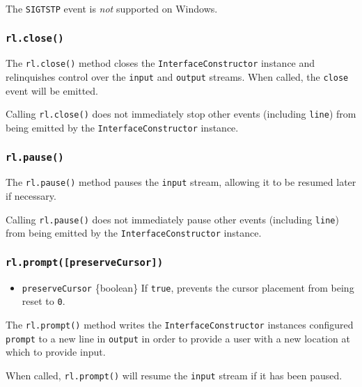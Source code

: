 The \texttt{\textquotesingle{}SIGTSTP\textquotesingle{}} event is
\emph{not} supported on Windows.

\subsubsection{\texorpdfstring{\texttt{rl.close()}}{rl.close()}}\label{rl.close}

The \texttt{rl.close()} method closes the \texttt{InterfaceConstructor}
instance and relinquishes control over the \texttt{input} and
\texttt{output} streams. When called, the
\texttt{\textquotesingle{}close\textquotesingle{}} event will be
emitted.

Calling \texttt{rl.close()} does not immediately stop other events
(including \texttt{\textquotesingle{}line\textquotesingle{}}) from being
emitted by the \texttt{InterfaceConstructor} instance.

\subsubsection{\texorpdfstring{\texttt{rl.pause()}}{rl.pause()}}\label{rl.pause}

The \texttt{rl.pause()} method pauses the \texttt{input} stream,
allowing it to be resumed later if necessary.

Calling \texttt{rl.pause()} does not immediately pause other events
(including \texttt{\textquotesingle{}line\textquotesingle{}}) from being
emitted by the \texttt{InterfaceConstructor} instance.

\subsubsection{\texorpdfstring{\texttt{rl.prompt({[}preserveCursor{]})}}{rl.prompt({[}preserveCursor{]})}}\label{rl.promptpreservecursor}

\begin{itemize}
\tightlist
\item
  \texttt{preserveCursor} \{boolean\} If \texttt{true}, prevents the
  cursor placement from being reset to \texttt{0}.
\end{itemize}

The \texttt{rl.prompt()} method writes the \texttt{InterfaceConstructor}
instances configured \texttt{prompt} to a new line in \texttt{output} in
order to provide a user with a new location at which to provide input.

When called, \texttt{rl.prompt()} will resume the \texttt{input} stream
if it has been paused.


